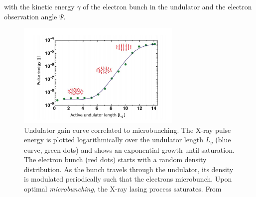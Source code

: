 with the kinetic energy $\gamma$ of the electron bunch in the undulator and the electron observation angle $\Psi$.\\
\begin{figure}
	\centering
		\includegraphics[width=0.7\textwidth]{images/gain-length.JPG}
	\caption[Undulator gain curve correlated to microbunching.]{Undulator gain curve correlated to microbunching. The X-ray pulse energy is plotted logarithmically over the undulator length $L_{g}$ (blue curve, green dots) and shows an exponential growth until saturation. The electron bunch (red dots) starts with a random density distribution. As the bunch travels through the undulator, its density is modulated periodically such that the electrons microbunch. Upon optimal \textit{microbunching}, the X-ray lasing process saturates. From \citep{Rupp-2013-Thesis,Rupp-2016-Springer}}
	\label{fig:gain-length}
\end{figure}

